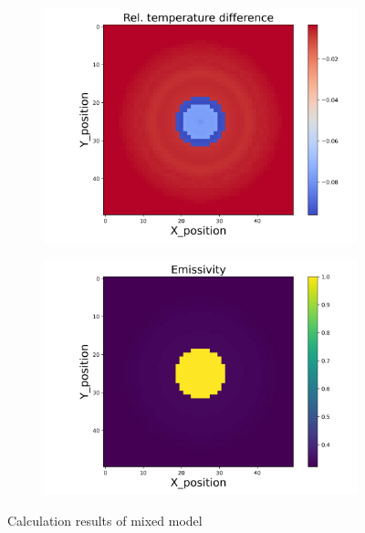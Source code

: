 \begin{figure}[htbp]
\begin{minipage}{\textwidth}
\begin{subfigure}{0.49\textwidth}
        \end{subfigure}
    \end{minipage}\\
    \begin{minipage}{\textwidth}
        \centering
        \begin{subfigure}{0.49\textwidth}
            \centering
            \includegraphics[width=\textwidth]{figures/raw_data/5/mix/T_bias.jpg}
        \end{subfigure}
        \begin{subfigure}{0.49\textwidth}
            \centering
            \includegraphics[width=\textwidth]{figures/raw_data/5/mix/emi_cal.jpg}
        \end{subfigure}
    \end{minipage}
    \caption{Calculation results of mixed model}
    \label{fig: result_mixed_model}
\end{figure}

